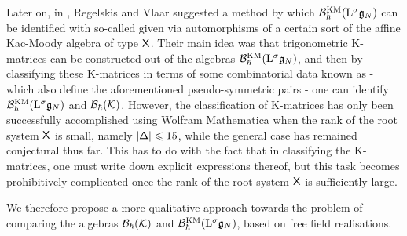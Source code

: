         Later on, in \cite{regelskis_vlaar_reflection_matrices_coideal_subalgebras}, Regelskis and Vlaar suggested a method by which $\mathcal{B}_{\hbar}^{\mathrm{KM}}(\mathrm{L}^{\sigma} \mathfrak{g}_N)$ can be identified with so-called  given via automorphisms of a certain sort of the affine Kac-Moody algebra of type $\mathsf{X}$. Their main idea was that trigonometric K-matrices can be constructed out of the algebras $\mathcal{B}_{\hbar}^{\mathrm{KM}}(\mathrm{L}^{\sigma} \mathfrak{g}_N)$, and then by classifying these K-matrices in terms of some combinatorial data known as  - which also define the aforementioned pseudo-symmetric pairs - one can identify $\mathcal{B}_{\hbar}^{\mathrm{KM}}(\mathrm{L}^{\sigma} \mathfrak{g}_N)$ and $\mathcal{B}_{\hbar}(\mathcal{K})$. However, the classification of K-matrices has only been successfully accomplished using \url{Wolfram Mathematica} when the rank of the root system $\mathsf{X}$ is small, namely $| \mathsf{\Delta} | \leqslant 15$, while the general case has remained conjectural thus far. This has to do with the fact that in classifying the K-matrices, one must write down explicit expressions thereof, but this task becomes prohibitively complicated once the rank of the root system $\mathsf{X}$ is sufficiently large. 

        We therefore propose a more qualitative approach towards the problem of comparing the algebras $\mathcal{B}_{\hbar}(\mathcal{K})$ and $\mathcal{B}_{\hbar}^{\mathrm{KM}}(\mathrm{L}^{\sigma}\mathfrak{g}_N)$, based on free field realisations. 
